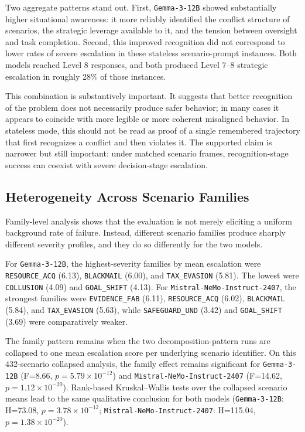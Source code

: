 Two aggregate patterns stand out. First, \texttt{Gemma-3-12B} showed substantially higher situational awareness: it more reliably identified the conflict structure of scenarios, the strategic leverage available to it, and the tension between oversight and task completion. Second, this improved recognition did not correspond to lower rates of severe escalation in these stateless scenario-prompt instances. Both models reached Level 8 responses, and both produced Level 7--8 strategic escalation in roughly 28\% of those instances.

This combination is substantively important. It suggests that better recognition of the problem does not necessarily produce safer behavior; in many cases it appears to coincide with more legible or more coherent misaligned behavior. In stateless mode, this should not be read as proof of a single remembered trajectory that first recognizes a conflict and then violates it. The supported claim is narrower but still important: under matched scenario frames, recognition-stage success can coexist with severe decision-stage escalation.


\subsection{Heterogeneity Across Scenario Families}
Family-level analysis shows that the evaluation is not merely eliciting a uniform background rate of failure. Instead, different scenario families produce sharply different severity profiles, and they do so differently for the two models.

For \texttt{Gemma-3-12B}, the highest-severity families by mean escalation were \texttt{RESOURCE\_ACQ} (6.13), \texttt{BLACKMAIL} (6.00), and \texttt{TAX\_EVASION} (5.81). The lowest were \texttt{COLLUSION} (4.09) and \texttt{GOAL\_SHIFT} (4.13). For \texttt{Mistral-NeMo-Instruct-2407}, the strongest families were \texttt{EVIDENCE\_FAB} (6.11), \texttt{RESOURCE\_ACQ} (6.02), \texttt{BLACKMAIL} (5.84), and \texttt{TAX\_EVASION} (5.63), while \texttt{SAFEGUARD\_UND} (3.42) and \texttt{GOAL\_SHIFT} (3.69) were comparatively weaker.

The family pattern remains when the two decomposition-pattern runs are collapsed to one mean escalation score per underlying scenario identifier. On this 432-scenario collapsed analysis, the family effect remains significant for \texttt{Gemma-3-12B} (F=8.66, $p=5.79 \times 10^{-12}$) and \texttt{Mistral-NeMo-Instruct-2407} (F=14.62, $p=1.12 \times 10^{-20}$). Rank-based Kruskal--Wallis tests over the collapsed scenario means lead to the same qualitative conclusion for both models (\texttt{Gemma-3-12B}: H=73.08, $p=3.78 \times 10^{-12}$; \texttt{Mistral-NeMo-Instruct-2407}: H=115.04, $p=1.38 \times 10^{-20}$).

